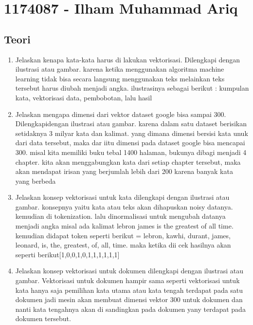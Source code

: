 \section{1174087 - Ilham Muhammad Ariq}
\subsection{Teori}
\begin{enumerate}
	\item Jelaskan kenapa kata-kata harus di lakukan vektorisasi. Dilengkapi dengan ilustrasi atau gambar.
	\hfill\break
	karena ketika menggunakan algoritma machine learning tidak bisa secara langsung menggunakan teks melainkan teks tersebut harus diubah menjadi angka.
	ilustrasinya sebagai berikut : kumpulan kata, vektorisasi data, pembobotan, lalu hasil

	\item Jelaskan mengapa dimensi dari vektor dataset google bisa sampai 300. Dilengkapidengan ilustrasi atau gambar.
	\hfill\break
	karena dalam satu dataset berisikan setidaknya 3 milyar kata dan kalimat. yang dimana dimensi bersisi kata unuk dari data tersebut, maka dar iitu dimensi pada dataset google bisa mencapai 300.
	misal kita memiliki buku tebal 1400 halaman, bukunya dibagi menjadi 4 chapter. kita akan menggabungkan kata dari setiap chapter tersebut, maka akan mendapat irisan yang berjumlah lebih dari 200 karena banyak kata yang berbeda

	\item Jelaskan konsep vektorisasi untuk kata dilengkapi dengan ilustrasi atau gambar.
	\hfill\break
	konsepnya yaitu kata atau teks akan dihapuskan noisy datanya. kemudian di tokenization. lalu dinormalisasi untuk mengubah datanya menjadi angka
	misal ada kalimat lebron james is the greatest of all time. kemudian didapat token seperti berikut = lebron, kawhi, durant, james, leonard, is, the, greatest, of, all, time.
	maka ketika dii cek hasilnya akan seperti berikut[1,0,0,1,0,1,1,1,1,1,1]

	\item Jelaskan konsep vektorisasi untuk dokumen dilengkapi dengan ilustrasi atau gambar.
	\hfill\break
	Vektorisasi untuk dokumen hampir sama seperti vektorisasi untuk kata hanya saja pemilihan kata utama atau kata tengah terdapat pada satu dokumen jadi mesin akan membuat dimensi vektor 300 untuk dokumen dan nanti kata tengahnya akan di sandingkan pada dokumen yany terdapat pada dokumen tersebut.
	


\end{enumerate}
